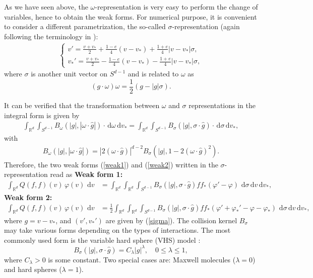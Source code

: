\documentclass[review, times]{elsarticle}
\newcommand{\rd}{\,\mathrm{d}}
\begin{document}
As we have seen above, the $\omega$-representation is very easy to perform the change of variables, hence to obtain the weak forms. For numerical purpose, it is convenient to consider a different parametrization, the so-called $\sigma$-representation (again following the terminology in \cite{Villani02}):
\begin{align} \label{sigma}
\left\{
\begin{array}{l}
\displaystyle v'=\frac{v+v_*}{2}+\frac{1-e}{4}(v-v_*)+\frac{1+e}{4}|v-v_*|\sigma, \\[8pt]
\displaystyle v_*'=\frac{v+v_*}{2}- \frac{1-e}{4}(v-v_*)-\frac{1+e}{4}|v-v_*|\sigma,
\end{array}\right.
\end{align}
where $\sigma$ is another unit vector on $S^{d-1}$ and is related to $\omega$ as
\begin{equation} \label{relation}
(g\cdot \omega)\omega=\frac{1}{2}(g-|g|\sigma).
\end{equation}

It can be verified that the transformation between $\omega$ and $\sigma$ representations in the integral form is given by
\begin{align}
\int_{\mathbb{R}^d}\int_{S^{d-1}}B_{\omega}(|g|,|\omega\cdot \hat{g}|)\cdot \rd{\omega}\rd{v_*}=\int_{\mathbb{R}^d}\int_{S^{d-1}}B_{\sigma}(|g|,\sigma\cdot \hat{g})\cdot \rd{\sigma}\rd{v_*},
\end{align}
with 
\begin{align}
B_{\omega}(|g|, |\omega\cdot \hat{g}|) =|2(\omega\cdot \hat{g})|^{d-2}B_{\sigma}(|g|,1-2(\omega\cdot\hat{g})^2).
\end{align}
Therefore, the two weak forms (\ref{weak1}) and (\ref{weak2}) written in the $\sigma$-representation read as
{\bf Weak form 1:}
\begin{align} \label{weak11}
\int_{\mathbb{R}^d} Q(f,f)(v)\,\varphi(v)\,\rd{v}&= \int_{\mathbb{R}^d} \int_{\mathbb{R}^d} \int_{S^{d-1}} B_{\sigma}(|g|,\sigma\cdot \hat{g})ff_*  \left(\varphi'-\varphi\right)\,\rd{\sigma} \rd{v} \rd{v_*},
\end{align}
{\bf Weak form 2:}
\begin{align} \label{weak22}
\int_{\mathbb{R}^d} Q(f,f)(v)\,\varphi(v)\,\rd{v}&=\frac{1}{2} \int_{\mathbb{R}^d} \int_{\mathbb{R}^d} \int_{S^{d-1}} B_{\sigma}(|g|,\sigma\cdot \hat{g})ff_*\left(\varphi'+\varphi_*'-\varphi-\varphi_* \right)\,\rd{\sigma} \rd{v} \rd{v_*},
\end{align}
where $g=v-v_*$, and $(v',v_*')$ are given by (\ref{sigma}). The collision kernel $B_{\sigma}$ may take various forms depending on the types of interactions. The most commonly used form is the variable hard sphere (VHS) model \cite{Bird}:
\begin{equation} \label{VHS}
B_{\sigma}(|g|,\sigma\cdot \hat{g})=C_{\lambda}|g|^{\lambda}, \quad 0\leq \lambda \leq 1,
\end{equation}
where $C_{\lambda}> 0$ is some constant. Two special cases are: Maxwell molecules ($\lambda=0$) and hard spheres ($\lambda=1$). 
\end{document}
